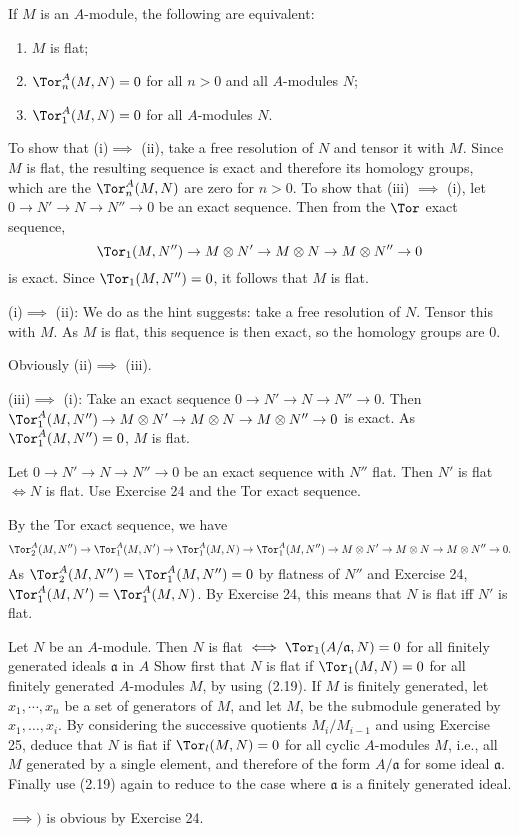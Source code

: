 \begin{questions}
	If $M$ is an $A$-module, the following are equivalent:
	\begin{enumerate}
		\item $M$ is flat;
		\item $\Tor^A_n(M,N) = 0$ for all $n > 0$ and all $A$-modules $N $;
		\item $\Tor_1^A(M,N) = 0$ for all $A$-modules $N$.
	\end{enumerate}
	\ifhint
		To show that (i)$\implies$ (ii), take a free resolution of $N$ and tensor it with $M$. Since $M$ is flat, the resulting sequence is exact and therefore its homology groups, which are the $\Tor^A_n(M,N)$ are zero for $n > 0$. To show that (iii) $\implies$ (i), let $0\to N' \to N \to N''\to 0$ be an exact sequence. Then from the $\Tor$ exact sequence,
		\[
			\Tor_1(M,N'') \to M \otimes N' \to M \otimes N \to M \otimes N'' \to 0
		\]
		is exact. Since $\Tor_1(M,N'') = 0 $, it follows that $M$ is flat.
	\fi
	\begin{solution}
		(i)$\implies$ (ii):
		We do as the hint suggests: take a free resolution of $N$.
		Tensor this with $M$.
		As $M$ is flat, this sequence is then exact, so the homology groups are 0.

		Obviously (ii)$\implies$ (iii).

		(iii)$\implies$ (i):
		Take an exact sequence $0\to N' \to N \to N'' \to 0$.
		Then $\Tor_1^A(M,N'') \to M \otimes N' \to M \otimes N \to M \otimes N'' \to 0$ is exact.
		As $\Tor_1^A(M,N'') = 0 $, $M$ is flat.
	\end{solution}

	\question Let $0\to N'\to N\to N''\to 0$ be an exact sequence with $N''$ flat. Then $N'$ is flat $\iff N$ is flat.
	\ifhint
		Use Exercise 24 and the Tor exact sequence.
	\fi
	\begin{solution}
		By the Tor exact sequence, we have
		\[
			\Tor_2^A(M,N'') \to \Tor_1^A(M,N') \to \Tor_1^A(M,N) \to \Tor_1^A(M,N'') \to M \otimes  N' \to M \otimes N \to M \otimes N'' \to 0
		.\]
		As $\Tor_2^A(M,N'') = \Tor_1^A(M,N'') = 0$ by flatness of $N''$ and Exercise 24, $\Tor_1^A(M,N') = \Tor_1^A(M, N)$.
		By Exercise 24, this means that $N$ is flat iff $N'$ is flat.
	\end{solution}

	\question Let $N$ be an $A$-module. Then $N$ is flat $\iff \Tor_1(A / \mathfrak{a}, N) = 0$ for all finitely generated ideals $\mathfrak{a}$ in $A $
	\ifhint
		Show first that $N$ is flat if $\Tor_1(M, N) = 0$ for all finitely generated $A$-modules $M $, by using (2.19). If $M$ is finitely generated, let $x_1, \cdots , x_n$ be a set of generators of $M $, and let $M $, be the submodule generated by $x_{1}, \ldots ,x_i$. By considering the successive quotients $M_i/M_{i-1}$ and using Exercise 25, deduce that $N$ is fiat if $\Tor_l(M, N) = 0$ for all cyclic $A$-modules $M $, i.e., all $M$ generated by a single element, and therefore of the form $A/\mathfrak{a}$ for some ideal $\mathfrak{a}$. Finally use (2.19) again to reduce to the case where $\mathfrak{a}$ is a finitely generated ideal.
		\fi
	\begin{solution}
		$\implies)$ is obvious by Exercise 24.


\end{solution}
\end{questions}
